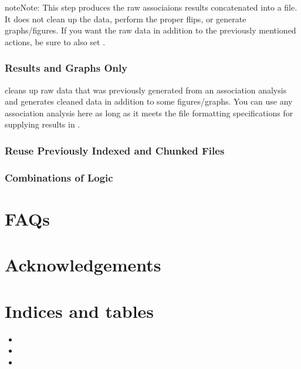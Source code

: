 \documentclass[letterpaper,10pt,english]{sphinxmanual}
\begin{document}
\begin{sphinxadmonition}{note}{Note:}
This step produces the raw associaions results concatenated into a file.  It does not clean up the data, perform the proper flips, or generate graphs/figures.  If you want the raw data in addition to the previously mentioned actions, be sure to also set .
\end{sphinxadmonition}


\subsection{Results and Graphs Only}
\label{\detokenize{exampleWorkFlows:results-and-graphs-only}}
 cleans up raw data that was previously generated from an association analysis and generates cleaned data in addition to some figures/graphs.  You can use any association analysis here as long as it meets the file formatting specifications for supplying results in .


\subsection{Reuse Previously Indexed and Chunked Files}
\label{\detokenize{exampleWorkFlows:reuse-previously-indexed-and-chunked-files}}

\subsection{Combinations of Logic}
\label{\detokenize{exampleWorkFlows:combinations-of-logic}}

\chapter{FAQs}
\label{\detokenize{index:faqs}}

\chapter{Acknowledgements}
\label{\detokenize{index:acknowledgements}}

\chapter{Indices and tables}
\label{\detokenize{index:indices-and-tables}}\begin{itemize}
\item {} 

\item {} 

\item {} 

\end{itemize}



\renewcommand{\indexname}{Index}
\printindex
\end{document}

